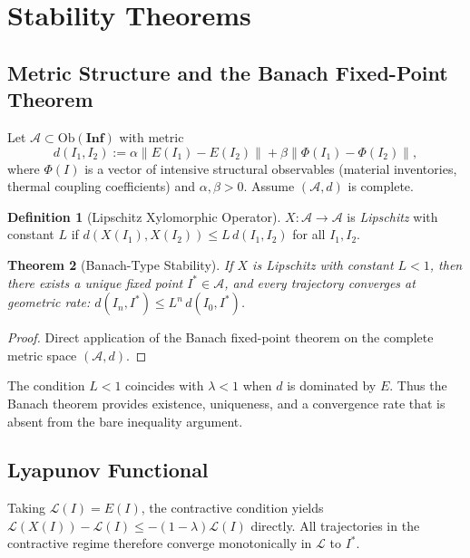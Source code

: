 \documentclass[10pt,twocolumn]{article}
\theoremstyle{plain}
\newtheorem{theorem}{Theorem}
\theoremstyle{definition}
\newtheorem{definition}[theorem]{Definition}
\theoremstyle{remark}
\begin{document}
\section{Stability Theorems}

\subsection{Metric Structure and the Banach Fixed-Point Theorem}

Let $\mathcal{A} \subset \mathrm{Ob}(\mathbf{Inf})$ with metric
\[
  d(I_1, I_2) := \alpha \|E(I_1) - E(I_2)\| + \beta \|\Phi(I_1) - \Phi(I_2)\|,
\]
where $\Phi(I)$ is a vector of intensive structural observables
(material inventories, thermal coupling coefficients) and $\alpha, \beta
> 0$. Assume $(\mathcal{A}, d)$ is complete.

\begin{definition}[Lipschitz Xylomorphic Operator]
$X : \mathcal{A} \to \mathcal{A}$ is \emph{Lipschitz} with constant $L$
if $d(X(I_1), X(I_2)) \leq L\, d(I_1, I_2)$ for all $I_1, I_2$.
\end{definition}

\begin{theorem}[Banach-Type Stability]
\label{thm:banach}
If $X$ is Lipschitz with constant $L < 1$, then there exists a unique
fixed point $I^* \in \mathcal{A}$, and every trajectory converges at
geometric rate: $d(I_n, I^*) \leq L^n\, d(I_0, I^*)$.
\end{theorem}

\begin{proof}
Direct application of the Banach fixed-point theorem on the complete
metric space $(\mathcal{A}, d)$.
\end{proof}

The condition $L < 1$ coincides with $\lambda < 1$ when $d$ is dominated
by $E$. Thus the Banach theorem provides existence, uniqueness, and a
convergence rate that is absent from the bare inequality argument.

\subsection{Lyapunov Functional}

Taking $\mathcal{L}(I) = E(I)$, the contractive condition yields
$\mathcal{L}(X(I)) - \mathcal{L}(I) \leq -(1 - \lambda)\mathcal{L}(I)$
directly. All trajectories in the contractive regime therefore converge
monotonically in $\mathcal{L}$ to $I^*$.
\end{document}
